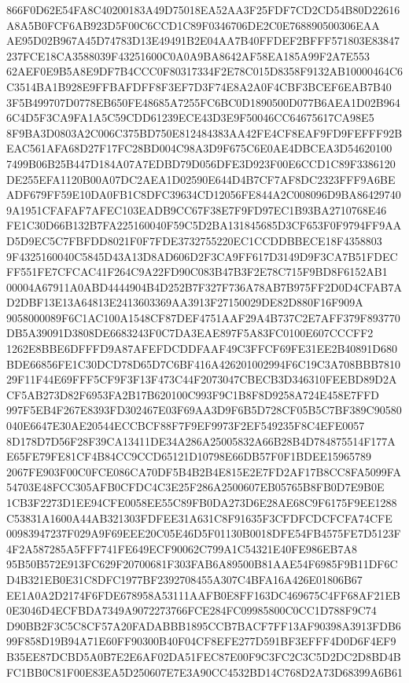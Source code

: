 \documentclass[UTF8,fontset=fandol,zihao=-4,a4paper]{ctexart}
\begin{document}
{{866F0D62E54FA8C40200183A49D75018EA52AA3F25FDF7CD2CD54B80D22616A8A5B0FCF6AB923D5F00C6CCD1C89F0346706DE2C0E768890500306EAA
AE95D02B967A45D74783D13E49491B2E04AA7B40FFDEF2BFFF571803E83847237FCE18CA3588039F43251600C0A0A9BA8642AF58EA185A99F2A7E553
62AEF0E9B5A8E9DF7B4CCC0F80317334F2E78C015D8358F9132AB10000464C6C3514BA1B928E9FFBAFDFF8F3EF7D3F74E8A2A0F4CBF3BCEF6EAB7B40
3F5B499707D0778EB650FE48685A7255FC6BC0D1890500D077B6AEA1D02B9646C4D5F3CA9FA1A5C59CDD61239ECE43D3E9F50046CC64675617CA98E5
8F9BA3D0803A2C006C375BD750E812484383AA42FE4CF8EAF9FD9FEFFF92BEAC561AFA68D27F17FC28BD004C98A3D9F675C6E0AE4DBCEA3D54620100
7499B06B25B447D184A07A7EDBD79D056DFE3D923F00E6CCD1C89F3386120DE255EFA1120B00A07DC2AEA1D02590E644D4B7CF7AF8DC2323FFF9A6BE
ADF679FF59E10DA0FB1C8DFC39634CD12056FE844A2C008096D9BA864297409A1951CFAFAF7AFEC103EADB9CC67F38E7F9FD97EC1B93BA2710768E46
FE1C30D66B132B7FA225160040F59C5D2BA131845685D3CF653F0F9794FF9AAD5D9EC5C7FBFDD8021F0F7FDE3732755220EC1CCDDBBECE18F4358803
9F4325160040C5845D43A13D8AD606D2F3CA9FF617D3149D9F3CA7B51FDECFF551FE7CFCAC41F264C9A22FD90C083B47B3F2E78C715F9BD8F6152AB1
00004A67911A0ABD4444904B4D252B7F327F736A78AB7B975FF2D0D4CFAB7AD2DBF13E13A64813E2413603369AA3913F27150029DE82D880F16F909A
9058000089F6C1AC100A1548CF87DEF4751AAF29A4B737C2E7AFF379F893770DB5A39091D3808DE6683243F0C7DA3EAE897F5A83FC0100E607CCCFF2
1262E8BBE6DFFFD9A87AFEFDCDDFAAF49C3FFCF69FE31EE2B40891D680BDE66856FE1C30DCD78D65D7C6BF416A426201002994F6C19C3A708BBB7810
29F11F44E69FFF5CF9F3F13F473C44F2073047CBECB3D346310FEEBD89D2ACF5AB273D82F6953FA2B17B620100C993F9C1B8F8D9258A724E458E7FFD
997F5EB4F267E8393FD302467E03F69AA3D9F6B5D728CF05B5C7BF389C90580040E6647E30AE20544ECCBCF88F7F9EF9973F2EF549235F8C4EFE0057
8D178D7D56F28F39CA13411DE34A286A25005832A66B28B4D784875514F177AE65FE79FE81CF4B84CC9CCD65121D10798E66DB57F0F1BDEE15965789
2067FE903F00C0FCE086CA70DF5B4B2B4E815E2E7FD2AF17B8CC8FA5099FA54703E48FCC305AFB0CFDC4C3E25F286A2500607EB05765B8FB0D7E9B0E
1CB3F2273D1EE94CFE0058EE55C89FB0DA273D6E28AE68C9F6175F9EE1288C53831A1600A44AB321303FDFEE31A631C8F91635F3CFDFCDCFCFA74CFE
00983947237F029A9F69EEE20C05E46D5F01130B0018DFE54FB4575FE7D5123F4F2A587285A5FFF741FE649ECF90062C799A1C54321E40FE986EB7A8
95B50B572E913FC629F20700681F303FAB6A89500B81AAE54F6985F9B11DF6CD4B321EB0E31C8DFC1977BF2392708455A307C4BFA16A426E01806B67
EE1A0A2D2174F6FDE678958A53111AAFB0E8FF163DC469675C4FF68AF21EB0E3046D4ECFBDA7349A9072273766FCE284FC09985800C0CC1D788F9C74
D90BB2F3C5C8CF57A20FADABBB1895CCB7BACF7FF13AF90398A3913FDB699F858D19B94A71E60FF90300B40F04CF8EFE277D591BF3EFFF4D0D6F4EF9
B35EE87DCBD5A0B7E2E6AF02DA51FEC87E00F9C3FC2C3C5D2DC2D8BD4BFC1BB0C81F00E83EA5D250607E7E3A90CC4532BD14C768D2A73D68399A6B61
}}
\end{document}
